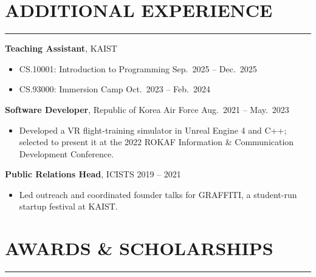 \documentclass[11pt, a4paper]{article}
\newcommand{\resumesection}[1]{
    \vspace{-0.35cm}
    \section*{#1}
    \vspace{-0.25cm}
    \hrule\vspace{0.2cm}
}
\begin{document}
\resumesection{ADDITIONAL EXPERIENCE}

\textbf{Teaching Assistant}, KAIST

\begin{itemize}[leftmargin=1.2em]
    \item CS.10001: Introduction to Programming \hfill Sep.\ 2025 -- Dec.\ 2025
    \item CS.93000: Immersion Camp \hfill Oct.\ 2023 -- Feb.\ 2024
\end{itemize}

\vspace{0.05cm}

\textbf{Software Developer}, Republic of Korea Air Force
\hfill Aug.\ 2021 -- May.\ 2023

\begin{itemize}[leftmargin=1.2em]
    \item Developed a VR flight-training simulator in Unreal Engine 4 and C++; selected to present it at the 2022 ROKAF Information \& Communication Development Conference.
\end{itemize}

\vspace{0.05cm}

\textbf{Public Relations Head}, ICISTS
\hfill 2019 -- 2021

\begin{itemize}[leftmargin=1.2em]
    \item Led outreach and coordinated founder talks for GRAFFITI, a student-run startup festival at KAIST.
\end{itemize}

\resumesection{AWARDS \& SCHOLARSHIPS}
\end{document}
